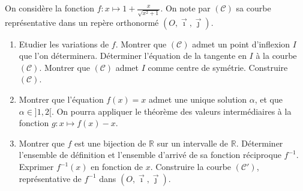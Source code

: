       \begin{exo}
\label{exo:fn inflexion recip}
      On consid\`ere la fonction $f:x\mapsto 1+\frac{x}{\sqrt{x^2 + 1}}$.
      On note par $(\mathscr{C})$ sa courbe repr\'esentative dans un rep\`ere orthonorm\'e $(O,\vec{\imath},\vec{\jmath})$.
      \begin{enumerate}
            \item 
                              Etudier les variations de $f$.
                              Montrer que $(\mathscr{C})$ admet un point d'inflexion $I$ que l'on d\'eterminera.
                              D\'eterminer l'\'equation de la tangente en $I$ \`a la courbe $(\mathscr{C})$.
                              Montrer que $(\mathscr{C})$ admet $I$ comme centre de sym\'etrie.
                              Construire $(\mathscr{C})$.
            \item Montrer que l'\'equation $f(x) = x$ admet une unique solution $\alpha$, et que $\alpha \in ]1,2[$.
                  On pourra appliquer le th\'eor\`eme des valeurs interm\'ediaires \`a la fonction $g : x \mapsto f(x) - x$.
            \item 
                              Montrer que $f$ est une bijection de $\mathbb{R}$ sur un intervalle de $\mathbb{R}$.
                              D\'eterminer l'ensemble de d\'efinition et l'ensemble d'arriv\'e de 
                              sa fonction r\'eciproque $f^{-1}$.
                              Exprimer $f^{-1}(x)$ en fonction de $x$.
                              Construire la courbe $(\mathscr{C}')$, repr\'esentative de $f^{-1}$ 
                              dans $(O,\vec{\imath},\vec{\jmath})$.            
      \end{enumerate}
      \end{exo}
